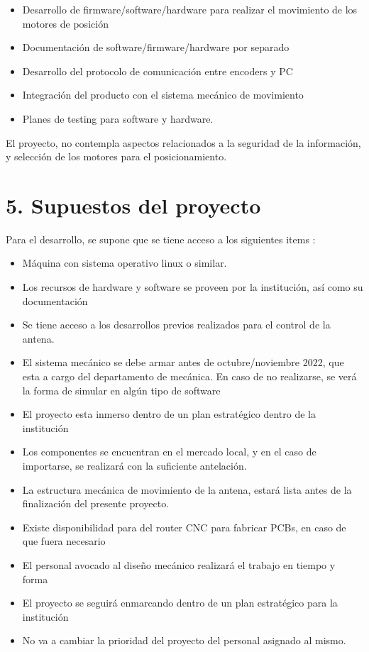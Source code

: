 \documentclass[11pt, %
codirector, %
]{charter}
\begin{document}
\begin{itemize}
	\item Desarrollo de firmware/software/hardware para realizar el movimiento de los motores de posición 
	\item  Documentación de software/firmware/hardware por separado
	\item  Desarrollo del protocolo de comunicación entre encoders y PC
	\item  Integración del producto con el sistema mecánico de movimiento
	\item Planes de testing para software y hardware. 
	
\end{itemize}

El proyecto, no contempla aspectos relacionados a la seguridad de la información, y selección de los motores para el posicionamiento.  


\section{5. Supuestos del proyecto}
\label{sec:supuestos}
	Para el desarrollo, se supone que se tiene acceso a los siguientes items : 
	\begin{itemize}
		\item Máquina con sistema operativo linux o similar. 
		\item Los recursos de hardware y software se proveen por la institución, así como su documentación
		\item Se tiene acceso a los desarrollos previos realizados para el control de la antena. 
		\item El sistema mecánico se debe armar antes de octubre/noviembre 2022, que esta a cargo del departamento de mecánica. En caso de no realizarse, se verá la forma de simular en algún tipo de software
		\item El proyecto esta inmerso dentro de un plan estratégico dentro de la institución
		\item Los componentes se encuentran en el mercado local, y en el caso de importarse, se realizará con la suficiente antelación. 
		\item La estructura mecánica de movimiento de la antena, estará lista antes de la finalización del presente proyecto. 
		\item Existe disponibilidad para del router CNC para fabricar PCBs, en caso de que fuera necesario 
		\item El personal avocado al diseño mecánico realizará el trabajo en tiempo y forma 
		\item El proyecto se seguirá enmarcando dentro de un plan estratégico para la institución 
		\item No va a cambiar la prioridad del proyecto del personal asignado al mismo.  
 

	\end{itemize}
	
\end{document}

